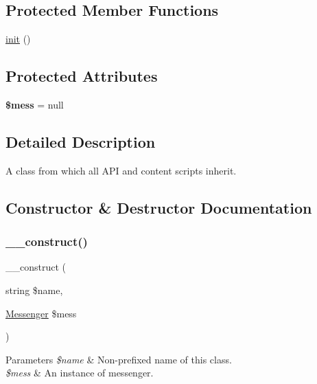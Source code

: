 \subsection*{Protected Member Functions}
\begin{DoxyCompactItemize}
\item 
\hyperlink{class_lora_1_1_base_action_a4be4055f3361d4800e16bc2e2e38cda6}{init} ()
\end{DoxyCompactItemize}
\subsection*{Protected Attributes}
\begin{DoxyCompactItemize}
\item 
\mbox{\label{class_lora_1_1_base_action_a7402b7f726abbbfe8793e75fafcd5e91}} 
{\bfseries \$mess} = null
\end{DoxyCompactItemize}


\subsection{Detailed Description}
A class from which all A\+PI and content scripts inherit. 

\subsection{Constructor \& Destructor Documentation}
\mbox{\label{class_lora_1_1_base_action_a605a9aac4f379b8beeef22a91ad9f0ff}} 
\subsubsection{\texorpdfstring{\+\_\+\+\_\+construct()}{\_\_construct()}}
{\footnotesize\ttfamily \+\_\+\+\_\+construct (\begin{DoxyParamCaption}\item[{string}]{\$name,  }\item[{\hyperlink{class_lora_1_1_messenger}{Messenger}}]{\$mess }\end{DoxyParamCaption})}


\begin{DoxyParams}{Parameters}
{\em \$name} & Non-\/prefixed name of this class. \\
\hline
{\em \$mess} & An instance of messenger. \\
\hline
\end{DoxyParams}

